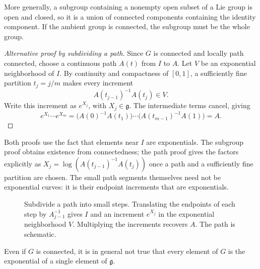 \documentclass[../main.tex]{subfiles}
\begin{document}
\begin{remark}
  More generally, a subgroup containing a nonempty open subset of a Lie group is open and closed, so it is a union of connected components containing the identity component. If the ambient group is connected, the subgroup must be the whole group.
\end{remark}

\begin{proof}[Alternative proof by subdividing a path]
  Since $G$ is connected and locally path connected, choose a continuous path $A(t)$ from $I$ to $A$. Let $V$ be an exponential neighborhood of $I$. By continuity and compactness of $[0,1]$, a sufficiently fine partition $t_j=j/m$ makes every increment
  \begin{equation*}
    A(t_{j-1})^{-1}A(t_j)\in V.
  \end{equation*}
  Write this increment as $e^{X_j}$, with $X_j\in\mathfrak{g}$. The intermediate terms cancel, giving
  \begin{equation*}
    e^{X_1}\cdots e^{X_m}
    =\bigl(A(0)^{-1}A(t_1)\bigr)\cdots
      \bigl(A(t_{m-1})^{-1}A(1)\bigr)
    =A.
  \end{equation*}
\end{proof}

\begin{remark}
  Both proofs use the fact that elements near $I$ are exponentials. The subgroup proof obtains existence from connectedness; the path proof gives the factors explicitly as $X_j=\log(A(t_{j-1})^{-1}A(t_j))$ once a path and a sufficiently fine partition are chosen. The small path segments themselves need not be exponential curves: it is their endpoint increments that are exponentials.
\end{remark}

\begin{figure}[ht]
    \centering
    \caption{Subdivide a path into small steps. Translating the endpoints of each step by $A_{j-1}^{-1}$ gives $I$ and an increment $e^{X_j}$ in the exponential neighborhood $V$. Multiplying the increments recovers $A$. The path is schematic.}
    \label{fig:exponential-path-steps}
\end{figure}

\begin{remark}
  Even if $G$ is connected, it is in general not true that every element of $G$ is the exponential of a single element of $\mathfrak{g}$.
\end{remark}
\end{document}

